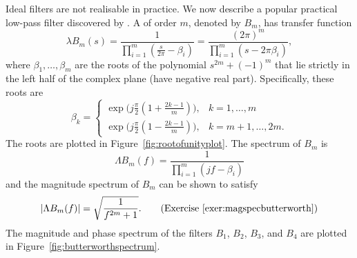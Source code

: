 Ideal filters are not realisable in practice.  %
We now describe a popular practical low-pass filter discovered by \citet{Butterworth1930}.  A  of order $m$, denoted by $B_m$, has transfer function
\[
\lambda B_m(s) = \frac{1}{\prod_{i=1}^m(\tfrac{s}{2\pi} - \beta_i)} = \frac{(2\pi)^m}{\prod_{i=1}^m(s - 2\pi\beta_i)},
\] 
where $\beta_1,\dots,\beta_m$ are the roots of the polynomial $s^{2m} + (-1)^m$ that lie strictly in the left half of the complex plane (have negative real part).  Specifically, these roots are
\[
\beta_{k} = \begin{cases}
\exp\big(j\tfrac{\pi}{2}( 1 + \tfrac{2k-1}{m} )\big) , & k = 1, \dots, m \\
\exp\big(j\tfrac{\pi}{2}( 1 - \tfrac{2k-1}{m} )\big) , & k = m+1, \dots, 2m.
\end{cases}
\]
The roots are plotted in Figure~\ref{fig:rootofunityplot}.  The spectrum of $B_m$ is
\[
\Lambda B_m(f) = \frac{1}{\prod_{i=1}^m( j f - \beta_i)}
\]
and the magnitude spectrum of $B_m$ can be shown to satisfy
\[
\left\vert \Lambda B_m(f) \right\vert = \sqrt{\frac{1}{f^{2m} + 1}}. \qquad \text{(Exercise~\ref{exer:magspecbutterworth})} 
\]
The magnitude and phase spectrum of the filters $B_1$, $B_2$, $B_3$, and $B_4$ are plotted in Figure~\ref{fig:butterworthspectrum}.


